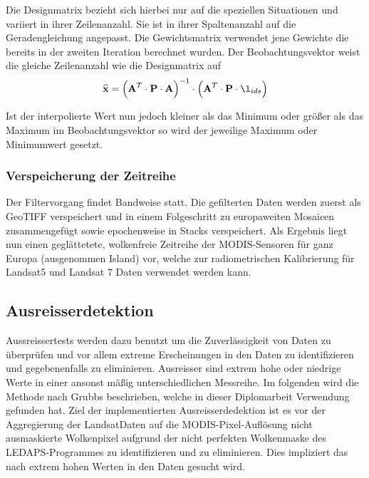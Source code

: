 \documentclass[11pt]{report}
\begin{document}
Die Designmatrix bezieht sich hierbei nur auf die speziellen Situationen und variiert in ihrer Zeilenanzahl. Sie ist in ihrer Spaltenanzahl auf die Geradengleichung angepasst. Die Gewichtsmatrix verwendet jene Gewichte die bereits in der zweiten Iteration berechnet wurden. Der Beobachtungsvektor weist die gleiche Zeilenanzahl wie die Designmatrix auf
\begin{equation}
\widehat{\textbf{x}} = \left(\textbf{A}^T\cdot\textbf{P}\cdot\textbf{A}\right)^{-1}\cdot\left(\textbf{A}^T\cdot\textbf{P}\cdot\l_{ids}\right)
\end{equation}\newline

Ist der interpolierte Wert nun jedoch kleiner als das Minimum oder größer als das Maximum im Beobachtungsvektor so wird der jeweilige Maximum oder Minimumwert gesetzt.

\subsubsection{Verspeicherung der Zeitreihe}
Der Filtervorgang findet Bandweise statt. Die gefilterten Daten werden zuerst als GeoTIFF verspeichert und in einem Folgeschritt zu europaweiten Mosaicen zusammengefügt sowie epochenweise in Stacks verspeichert. Als Ergebnis liegt nun einen geglättetete, wolkenfreie Zeitreihe der MODIS-Sensoren für ganz Europa (ausgenommen Island) vor, welche zur radiometrischen Kalibrierung für Landsat5 und Landsat 7 Daten verwendet werden kann.





\subsection{Ausreisserdetektion}
Aussreissertests werden dazu benutzt um die Zuverlässigkeit von Daten zu überprüfen und vor allem extreme Erscheinungen in den Daten zu identifizieren und gegebenenfalls zu eliminieren. Ausreisser sind extrem hohe oder niedrige Werte in einer ansonst mäßig unterschiedlichen Messreihe. Im folgenden wird die Methode nach Grubbs beschrieben, welche in dieser Diplomarbeit Verwendung gefunden hat. Ziel der implementierten Ausreisserdedektion ist es vor der Aggregierung der LandsatDaten auf die MODIS-Pixel-Auflösung nicht ausmaskierte Wolkenpixel aufgrund der nicht perfekten Wolkenmaske des LEDAPS-Programmes zu identifizieren und zu eliminieren. Dies impliziert das nach extrem hohen Werten in den Daten gesucht wird. \newline
\end{document}
